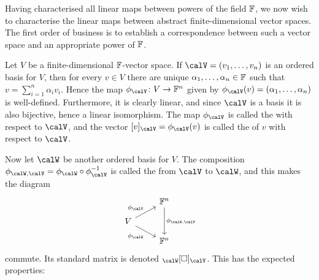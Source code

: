 Having characterised all linear maps between powers of the field $\mathbb{F}$, we now wish to characterise the linear maps between abstract finite-dimensional vector spaces. The first order of business is to establish a correspondence between such a vector space and an appropriate power of $\mathbb{F}$.

Let $V$ be a finite-dimensional $\mathbb{F}$-vector space. If $\calV = (v_1, \ldots, v_n)$ is an ordered basis for $V$, then for every $v \in V$ there are unique $\alpha_1, \ldots, \alpha_n \in \mathbb{F}$ such that $v = \sum_{i=1}^n \alpha_i v_i$. Hence the map $\coordmap{\calV} \colon V \to \fieldF^n$ given by $\coordmap{\calV}(v) = (\alpha_1, \ldots, \alpha_n)$ is well-defined. Furthermore, it is clearly linear, and since $\calV$ is a basis it is also bijective, hence a linear isomorphism. The map $\coordmap{\calV}$ is called the  with respect to $\calV$, and the vector $\coordvec{v}{\calV} = \coordmap{\calV}(v)$ is called the  of $v$ with respect to $\calV$.

Now let $\calW$ be another ordered basis for $V$. The composition $\basischange{\calW}{\calV} = \coordmap{\calW} \circ \inv{\coordmap{\calV}}$ is called the  from $\calV$ to $\calW$, and this makes the diagram
%
\begin{equation}
    \label{eq:change-of-basis-diagram}
    \begin{tikzcd}[row sep=small]
        & \fieldF^n
            \ar[dd, "\basischange{\calW}{\calV}"] \\
        V
            \ar[ru, "\coordmap{\calV}"]
            \ar[rd, "\coordmap{\calW}", swap] \\
        & \fieldF^n
    \end{tikzcd}
\end{equation}
%
commute. Its standard matrix is denoted $\basischangemat{\calW}{\calV}$. This has the expected properties:

